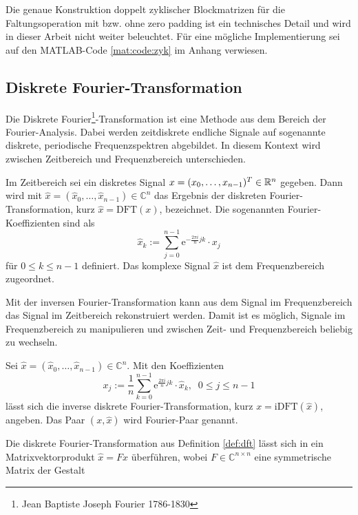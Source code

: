 Die genaue Konstruktion doppelt zyklischer Blockmatrizen für die Faltungsoperation mit bzw. ohne zero padding ist ein technisches Detail und wird in dieser Arbeit nicht weiter beleuchtet. Für eine mögliche Implementierung sei auf den MATLAB-Code \ref{mat:code:zyk} im Anhang verwiesen.
\subsection{Diskrete Fourier-Transformation}
Die Diskrete Fourier\footnote{Jean Baptiste Joseph Fourier 1786-1830}-Transformation ist eine Methode aus dem Bereich der Fourier-Analysis. Dabei werden zeitdiskrete endliche Signale auf sogenannte diskrete, periodische Frequenzspektren abgebildet. In diesem Kontext wird zwischen Zeitbereich und Frequenzbereich unterschieden.

\begin{defi}
    \label{def:dft}
    Im Zeitbereich sei ein diskretes Signal $x=(x_0, \ldots, x_{n-1})^T \in \mathbb{R}^n$ gegeben. Dann wird mit $\hat{x}=(\hat{x}_0, \ldots, \hat{x}_{n-1}) \in \mathbb{C}^n$ das Ergebnis der diskreten Fourier-Transformation, kurz $\hat{x}=\mathrm{DFT}(x)$, bezeichnet. Die sogenannten Fourier-Koeffizienten sind als 
    \begin{equation*}
        \hat{x}_k:=\sum_{j=0}^{n-1} \mathrm{e}^{- \frac{2 \pi i}{n} j k} \cdot x_j
    \end{equation*}
    für $0 \leq k \leq n-1$ definiert. Das komplexe Signal $\hat{x}$ ist dem Frequenzbereich zugeordnet.
\end{defi}
Mit der inversen Fourier-Transformation kann aus dem Signal im Frequenzbereich das Signal im Zeitbereich rekonstruiert werden. Damit ist es möglich, Signale im Frequenzbereich zu manipulieren und zwischen Zeit- und Frequenzbereich beliebig zu wechseln.
\begin{defi}
    Sei $\hat{x}=(\hat{x}_0, \ldots, \hat{x}_{n-1}) \in \mathbb{C}^n$. Mit den Koeffizienten
    \begin{equation*}
        x_j:= \frac{1}{n} \sum_{k=0}^{n-1} \mathrm{e}^{\frac{2 \pi i}{n} j k} \cdot \hat{x}_k, \; \; 0 \leq j \leq n-1
    \end{equation*}
    lässt sich die inverse diskrete Fourier-Transformation, kurz $x=\mathrm{iDFT}(\hat{x})$, angeben. Das Paar $(x ,\hat{x})$ wird Fourier-Paar genannt.
\end{defi}
Die diskrete Fourier-Transformation aus Definition \ref{def:dft} lässt sich in ein Matrixvektorprodukt $\hat{x}=Fx$ überführen, wobei $F \in \mathbb{C}^{n \times n}$ eine symmetrische Matrix der Gestalt
